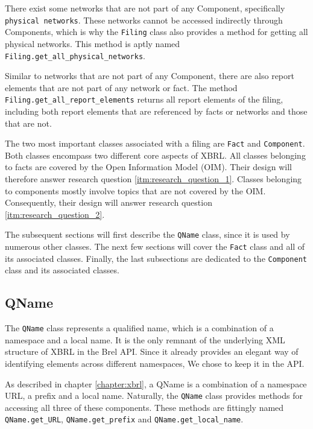 There exist some networks that are not part of any Component, specifically \texttt{physical\ networks}.
These networks cannot be accessed indirectly through Components, 
which is why the \texttt{Filing} class also provides a method for getting all physical networks.
This method is aptly named \texttt{Filing.get\_all\_physical\_networks}.

Similar to networks that are not part of any Component, 
there are also report elements that are not part of any network or fact.
The method \texttt{Filing.get\_all\_report\_elements} returns all report elements of the filing,
including both report elements that are referenced by facts or networks and those that are not.

The two most important classes associated with a filing are \texttt{Fact} and \texttt{Component}.
Both classes encompass two different core aspects of XBRL.
All classes belonging to facts are covered by the Open Information Model (OIM)\cite{oim}.
Their design will therefore answer research question \ref{itm:research_question_1}.
Classes belonging to components mostly involve topics that are not covered by the OIM.
Consequently, their design will answer research question \ref{itm:research_question_2}.

The subsequent sections will first describe the \texttt{QName} class,
since it is used by numerous other classes.
The next few sections will cover the \texttt{Fact} class and all of its associated classes.
Finally, the last subsections are dedicated to the \texttt{Component} class and its associated classes.

\subsection{QName}
\label{subsec:qname}

The \texttt{QName} class represents a qualified name, which is a combination of a namespace and a local name.
It is the only remnant of the underlying XML structure of XBRL in the Brel API.
Since it already provides an elegant way of identifying elements across different namespaces,
We chose to keep it in the API.

As described in chapter \ref{chapter:xbrl}, a QName is a combination of a namespace URL, a prefix and a local name.
Naturally, the \texttt{QName} class provides methods for accessing all three of these components.
These methods are fittingly named \texttt{QName.get\_URL}, \texttt{QName.get\_prefix} and \texttt{QName.get\_local\_name}.

